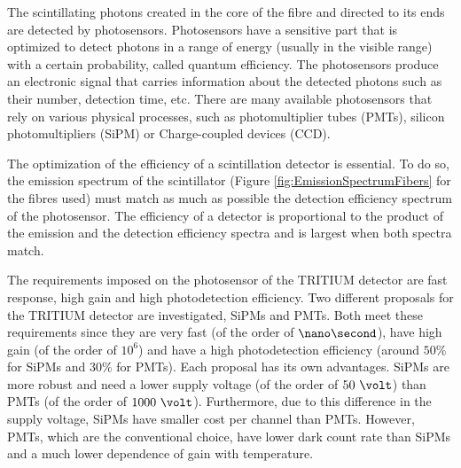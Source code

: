 The scintillating photons created in the core of the fibre and directed to its ends are detected by photosensors. Photosensors have a sensitive part that is optimized to detect photons in a range of energy (usually in the visible range) with a certain probability, called quantum efficiency. The photosensors produce an electronic signal that carries information about the detected photons such as their number, detection time, etc. There are many available photosensors that rely on various physical processes, such as photomultiplier tubes (PMTs), silicon photomultipliers (SiPM) or Charge-coupled devices (CCD).  %

The optimization of the efficiency of a scintillation detector is essential. To do so, the emission spectrum of the scintillator (Figure \ref{fig:EmissionSpectrumFibers} for the fibres used) must match as much as possible the detection efficiency spectrum of the photosensor. The efficiency of a detector is proportional to the product of the emission and the detection efficiency spectra and is largest when both spectra match.

The requirements imposed on the photosensor of the TRITIUM detector are fast response, high gain and high photodetection efficiency. Two different proposals for the TRITIUM detector are investigated, SiPMs and PMTs. Both meet these requirements since they are very fast (of the order of $\nano\second$), have high gain (of the order of $10^{6}$) and have a high photodetection efficiency (around $50\%$ for SiPMs and $30\%$ for PMTs). Each proposal has its own advantages. SiPMs are more robust and need a lower supply voltage (of the order of $50~\volt$) than PMTs (of the order of $1000~\volt$). Furthermore, due to this difference in the supply voltage, SiPMs have smaller cost per channel than PMTs. However, PMTs, which are the conventional choice, have lower dark count rate than SiPMs and a much lower dependence of gain with temperature.


